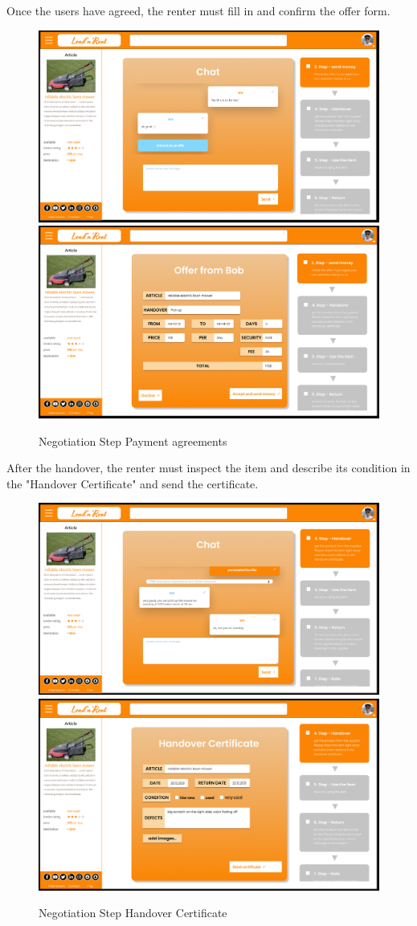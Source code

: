 \noindent
Once the users have agreed, the renter must fill in and confirm the offer form.

\begin{figure}[H]
	\centering
	\includegraphics[width=0.49\linewidth]{abb/13step3}
	\includegraphics[width=0.49\linewidth]{abb/14step3con}
	\caption{Negotiation Step Payment agreements}
	\label{fig:Negotiation2}
	\centering
\end{figure}

\noindent
After the handover, the renter must inspect the item and describe its condition in the "Handover Certificate" and send the certificate.

\begin{figure}[H]
	\centering
	\includegraphics[width=0.49\linewidth]{abb/15step4}
	\includegraphics[width=0.49\linewidth]{abb/16step4con}
	\caption{Negotiation Step Handover Certificate}
	\label{fig:Negotiation3}
	\centering
\end{figure}

